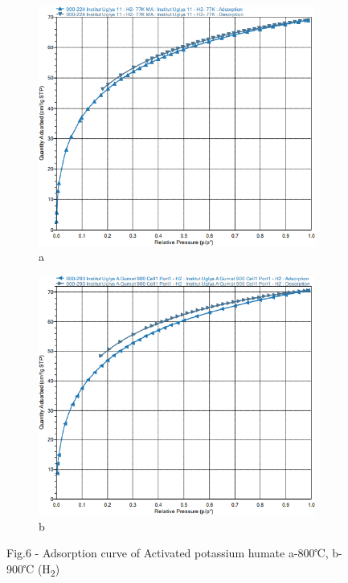 \begin{figure}[H]
    \centering
    \begin{subfigure}[t]{0.45\textwidth}
        \centering
        \includegraphics[width=\textwidth]{media/chem2/image107}
        \caption*{a}
    \end{subfigure}
    \begin{subfigure}[t]{0.45\textwidth}
        \centering
        \includegraphics[width=\textwidth]{media/chem2/image108}
        \caption*{b}
    \end{subfigure}
    \caption*{Fig.6 - Adsorption curve of Activated potassium humate a-800℃, b-900℃ (H\textsubscript{2})}
\end{figure}

